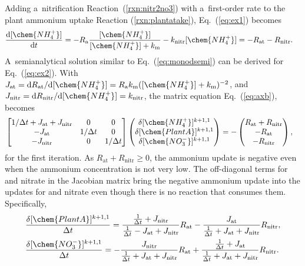 \documentclass[gmdd, online, hvmath]{copernicus}
\begin{document}
      Adding a~nitrification Reaction~(\ref{rxn:nitr2no3}) with
      a~first-order rate to the plant ammonium uptake Reaction
      (\ref{rxn:plantatake}), Eq.~(\ref{eq:ex1}) becomes
\begin{align}
 &
\frac{\mathrm{d} [\chem{NH_4^+}]}{\mathrm{d}t} =
- R_\mathrm{a} \frac{[\chem{NH_4^+}]}{[\chem{NH_4^+}]+k_\mathrm{m}} - k_{\text{nitr}} [\chem{NH_4^+}] = -R_{\text{at}} - R_{\text{nitr}}.
\label{eq:ex2}
\end{align}%
      A~semianalytical solution similar to Eq.~(\ref{eq:monodsemi}) can be
      derived for Eq.~(\ref{eq:ex2}). With $J_{\text{at}} = \mathrm{d}
      R_{\text{at}}/\mathrm{d} [\chem{NH_4^+}] =
      R_\mathrm{a}k_\mathrm{m}([\chem{NH_4^+}] + k_\mathrm{m})^{-2}$, and
      $J_{\text{nitr}} = \mathrm{d} R_{\text{nitr}}/\mathrm{d}
      [\chem{NH_4^+}]=k_{\text{nitr}}$, the matrix equation
      Eq.~(\ref{eq:axb}), becomes
\begin{align}
 &
\left[
\begin{matrix}
1/\Delta t + J_{\text{at}} + J_{\text{nitr}} & 0 & 0 \\
-J_{\text{at}} & 1/\Delta t & 0 \\
-J_{\text{nitr}} & 0 & 1/\Delta t \\
\end{matrix}
\right]
\left(\begin{matrix}
\delta [\chem{NH_4^+}]^{k+1,1} \\
\delta [\chem{PlantA}]^{k+1,1} \\
\delta [\chem{NO_3^-}]^{k+1,1}
\end{matrix}
\right)
=-
\left(\begin{matrix}
R_{\text{at}} + R_{\text{nitr}} \\
-R_{\text{at}} \\
-R_{\text{nitr}}
\end{matrix}
\right),
\label{eq:test2}
\end{align}%
      for the first iteration. As $R_{\text{at}} + R_{\text{nitr}} \geq 0$,
      the ammonium update is negative even when the ammonium concentration
      is not very low. The off-diagonal terms for  and nitrate
      in the Jacobian matrix bring the negative ammonium update into the
      updates for  and nitrate even though there is no reaction
      that consumes them. Specifically,
\begin{align}
 &
\frac{\delta [\chem{PlantA}]^{k+1,1}}{\Delta t}
= \frac{\frac{1}{\Delta t} + J_{\text{nitr}}}{\frac{1}{\Delta t} - J_{\text{at}} + J_{\text{nitr}}}
R_{\text{at}} - \frac{J_{\text{at}}} {\frac{1}{\Delta t} + J_{\text{at}} + J_{\text{nitr}}} R_{\text{nitr}},
\\
&
\frac{\delta [\chem{NO_3^-}]^{k+1,1}}{\Delta t}
= -\frac{J_{\text{nitr}}}{\frac{1}{\Delta t} + J_{\text{at}} + J_{\text{nitr}}} R_{\text{at}} +
\frac{\frac{1}{\Delta t} + J_{\text{at}}} {\frac{1}{\Delta t} + J_{\text{at}} + J_{\text{nitr}}}
R_{\text{nitr}}.
\end{align}%
\end{document}
